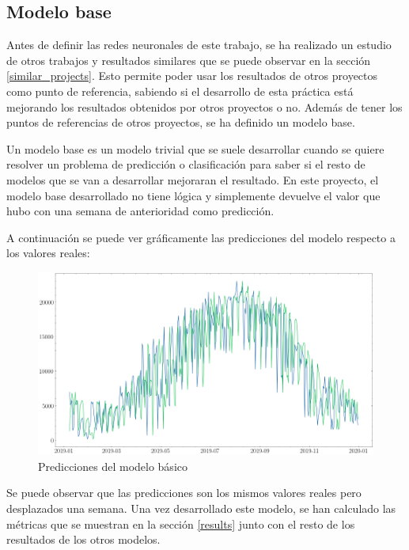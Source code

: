 \subsection{Modelo base}\label{baseline_model}
Antes de definir las redes neuronales de este trabajo, se ha realizado un estudio de otros trabajos y resultados similares que se puede observar en la sección \ref{similar_projects}. Esto permite poder usar los resultados de otros proyectos como punto de referencia, sabiendo si el desarrollo de esta práctica está mejorando los resultados obtenidos por otros proyectos o no. Además de tener los puntos de referencias de otros proyectos, se ha definido un modelo base.
\newline

Un modelo base es un modelo trivial que se suele desarrollar cuando se quiere resolver un problema de predicción o clasificación para saber si el resto de modelos que se van a desarrollar mejoraran el resultado. En este proyecto, el modelo base desarrollado no tiene lógica y simplemente devuelve el valor que hubo con una semana de anterioridad como predicción.  
\newline

A continuación se puede ver gráficamente las predicciones del modelo respecto a los valores reales:
\begin{figure}[H]
    \centering
    \includegraphics[width=16cm]{images/solution/predictions/baseline-predictions.png}
    \caption{Predicciones del modelo básico}
    \label{fig:baseline-predictions}
\end{figure}

Se puede observar que las predicciones son los mismos valores reales pero desplazados una semana. Una vez desarrollado este modelo, se han calculado las métricas que se muestran en la sección \ref{results} junto con el resto de los resultados de los otros modelos.
